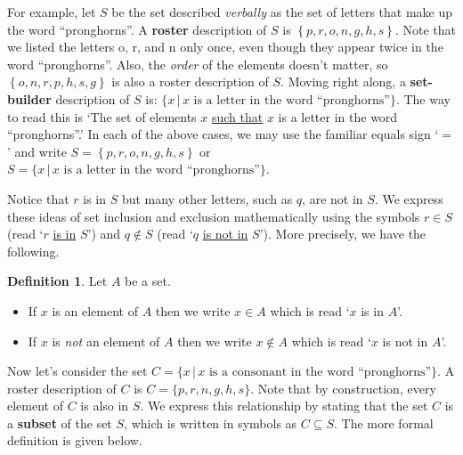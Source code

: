\documentclass[11pt]{article}
\theoremstyle{definition}  %
\newtheorem{defn}{\bf Definition}
\newcommand{\bbm}{\begin{boxedminipage}{6.41in}}
\newcommand{\ebm}{\end{boxedminipage}}
\begin{document}
\medskip

For example, let $S$ be the set described \textit{verbally} as the set of letters that make up the word ``pronghorns''.  A  \textbf{roster} description of $S$ is $\left\{ p, r, o, n, g, h, s \right\}$. Note that we listed  the letters o, r, and  n only once, even though they appear twice in the word ``pronghorns''.  Also, the \textit{order} of the elements doesn't matter, so $\left\{ o, n, r, p, h, s, g \right\}$ is also a roster description of $S$.  Moving right along,  a \textbf{set-builder} description of $S$ is: $\{ x \, | \, \mbox{$x$ is a letter in the word ``pronghorns''}\}$.  The way to read this is `The set of elements $x$ \underline{such that} $x$ is a letter in the word ``pronghorns''.'   In each of the above cases, we may use the familiar equals sign `$=$' and write  $S = \left\{ p, r, o, n, g, h, s \right\}$ or $S = \{ x \, | \, \mbox{$x$ is a letter in the word ``pronghorns''}\}$.  

\smallskip

Notice that  $r$ is in $S$ but many other letters, such as $q$, are not in $S$.  We express these ideas of set inclusion and exclusion mathematically using the symbols $r \in S$ (read `$r$ \underline{is in} $S$') and $q \notin S$ (read `$q$ \underline{is not in} $S$').  More precisely, we have the following.

\medskip

\colorbox{ResultColor}{\bbm

\begin{defn} \label{notationforsetinclusion}  Let $A$ be a set.

\begin{itemize}

\item If $x$ is an element of $A$ then we write $x \in A$\index{$\in$} which is read `$x$ is in $A$'.

\item If $x$ is \emph{not} an element of $A$ then we write $x \notin A$\index{$\notin$} which is read `$x$ is not in $A$'.

\end{itemize}

\end{defn}

\ebm}

\medskip

Now let's consider the set $C =  \{ x \, | \, \mbox{$x$ is a consonant in the word ``pronghorns''}\}$.  A roster description of $C$ is  $C = \{ p, r, n, g, h, s\}$.  Note that by construction, every element of $C$ is also in $S$.  We express this relationship by stating that the set $C$ is a \textbf{subset} of the set $S$, which is written in symbols as $C \subseteq S$.  The more formal definition is given below.
\end{document}
